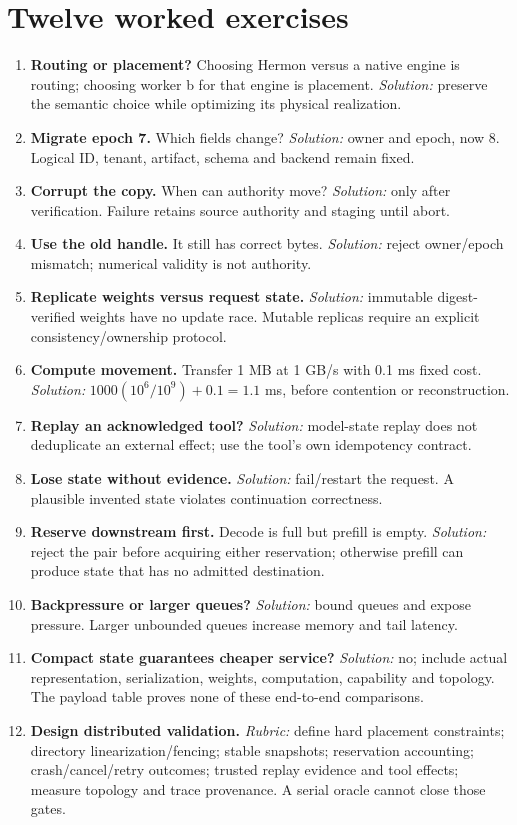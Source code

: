 \section{Twelve worked exercises}
\begin{enumerate}
\item \textbf{Routing or placement?} Choosing Hermon versus a native engine is
routing; choosing worker b for that engine is placement. \emph{Solution:}
preserve the semantic choice while optimizing its physical realization.
\item \textbf{Migrate epoch 7.} Which fields change? \emph{Solution:} owner and
epoch, now 8. Logical ID, tenant, artifact, schema and backend remain fixed.
\item \textbf{Corrupt the copy.} When can authority move? \emph{Solution:}
only after verification. Failure retains source authority and staging until abort.
\item \textbf{Use the old handle.} It still has correct bytes.
\emph{Solution:} reject owner/epoch mismatch; numerical validity is not authority.
\item \textbf{Replicate weights versus request state.} \emph{Solution:}
immutable digest-verified weights have no update race. Mutable replicas require
an explicit consistency/ownership protocol.
\item \textbf{Compute movement.} Transfer 1 MB at 1 GB/s with 0.1 ms fixed cost.
\emph{Solution:} $1000(10^6/10^9)+0.1=1.1$ ms, before contention or reconstruction.
\item \textbf{Replay an acknowledged tool?} \emph{Solution:} model-state replay
does not deduplicate an external effect; use the tool's own idempotency contract.
\item \textbf{Lose state without evidence.} \emph{Solution:} fail/restart the
request. A plausible invented state violates continuation correctness.
\item \textbf{Reserve downstream first.} Decode is full but prefill is empty.
\emph{Solution:} reject the pair before acquiring either reservation; otherwise
prefill can produce state that has no admitted destination.
\item \textbf{Backpressure or larger queues?} \emph{Solution:} bound queues and
expose pressure. Larger unbounded queues increase memory and tail latency.
\item \textbf{Compact state guarantees cheaper service?} \emph{Solution:} no;
include actual representation, serialization, weights, computation, capability
and topology. The payload table proves none of these end-to-end comparisons.
\item \textbf{Design distributed validation.} \emph{Rubric:} define hard placement
constraints; directory linearization/fencing; stable snapshots; reservation
accounting; crash/cancel/retry outcomes; trusted replay evidence and tool effects;
measure topology and trace provenance. A serial oracle cannot close those gates.
\end{enumerate}

